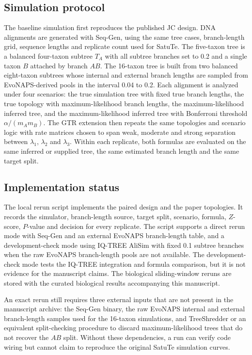 \documentclass[11pt]{article}
\begin{document}
\subsection*{Simulation protocol}

The baseline simulation first reproduces the published JC design. DNA alignments are generated with Seq-Gen, using the same tree cases, branch-length grid, sequence lengths and replicate count used for SatuTe. The five-taxon tree is a balanced four-taxon subtree \(T_A\) with all subtree branches set to 0.2 and a single taxon \(B\) attached by branch \(AB\). The 16-taxon tree is built from two balanced eight-taxon subtrees whose internal and external branch lengths are sampled from EvoNAPS-derived pools in the interval 0.04 to 0.2. Each alignment is analyzed under four scenarios: the true simulation tree with fixed true branch lengths, the true topology with maximum-likelihood branch lengths, the maximum-likelihood inferred tree, and the maximum-likelihood inferred tree with Bonferroni threshold \( \alpha/(m_A m_B) \). The GTR extension then repeats the same topologies and scenario logic with rate matrices chosen to span weak, moderate and strong separation between \(\lambda_1\), \(\lambda_2\) and \(\lambda_3\). Within each replicate, both formulas are evaluated on the same inferred or supplied tree, the same estimated branch length and the same target split.

\subsection*{Implementation status}

The local rerun script implements the paired design and the paper topologies. It records the simulator, branch-length source, target split, scenario, formula, \(Z\)-score, \(P\)-value and decision for every replicate. The script supports a direct rerun mode with Seq-Gen and an external EvoNAPS branch-length table, and a development-check mode using IQ-TREE AliSim with fixed 0.1 subtree branches when the raw EvoNAPS branch-length pools are not available. The development-check mode tests the IQ-TREE integration and formula comparison, but it is not evidence for the manuscript claims. The biological sliding-window reruns are stored with the curated biological results accompanying this manuscript.

An exact rerun still requires three external inputs that are not present in the manuscript archive: the Seq-Gen binary, the raw EvoNAPS internal and external branch-length samples used for the 16-taxon simulations, and TreeShredder or an equivalent split-checking procedure to discard maximum-likelihood trees that do not recover the \(AB\) split. Without these dependencies, a run can verify code wiring but cannot claim to reproduce the original SatuTe simulation curves.
\end{document}
